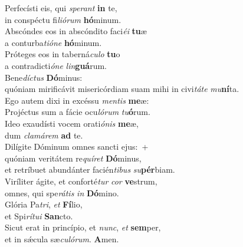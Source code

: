 \evenverse Perfecísti eis, qui \textit{spe}\textit{rant} \textbf{in} te,~\*\\
\evenverse in conspéctu fi\textit{li}\textit{ó}\textit{rum} \textbf{hó}minum.\\
\oddverse Abscóndes eos in abscóndito faci\textit{é}\textit{i} \textbf{tu}æ~\*\\
\oddverse a conturba\textit{ti}\textit{ó}\textit{ne} \textbf{hó}minum.\\
\evenverse Próteges eos in taberná\textit{cu}\textit{lo} \textbf{tu}o~\*\\
\evenverse a contradicti\textit{ó}\textit{ne} \textit{lin}\textbf{guá}rum.\\
\oddverse Bene\textit{dí}\textit{ctus} \textbf{Dó}minus:~\*\\
\oddverse quóniam mirificávit misericórdiam suam mihi in civi\textit{tá}\textit{te} \textit{mu}\textbf{ní}ta.\\
\evenverse Ego autem dixi in excéssu \textit{men}\textit{tis} \textbf{me}æ:~\*\\
\evenverse Projéctus sum a fácie ocu\textit{ló}\textit{rum} \textit{tu}\textbf{ó}rum.\\
\oddverse Ideo exaudísti vocem orati\textit{ó}\textit{nis} \textbf{me}æ,~\*\\
\oddverse dum \textit{cla}\textit{má}\textit{rem} \textbf{ad} te.\\
\evenverse Dilígite Dóminum omnes sancti ejus:~+\\
\evenverse  quóniam veritátem re\textit{quí}\textit{ret} \textbf{Dó}minus,~\*\\
\evenverse et retríbuet abundánter facién\textit{ti}\textit{bus} \textit{su}\textbf{pér}biam.\\
\oddverse Viríliter ágite, et conforté\textit{tur} \textit{cor} \textbf{ve}strum,~\*\\
\oddverse omnes, qui spe\textit{rá}\textit{tis} \textit{in} \textbf{Dó}mino.\\
\evenverse Glória Pa\textit{tri}, \textit{et} \textbf{Fí}lio,~\*\\
\evenverse et Spi\textit{rí}\textit{tu}\textit{i} \textbf{San}cto.\\
\oddverse Sicut erat in princípio, et \textit{nunc}, \textit{et} \textbf{sem}per,~\*\\
\oddverse et in sǽcula sæ\textit{cu}\textit{ló}\textit{rum}. \textbf{A}men.\\
